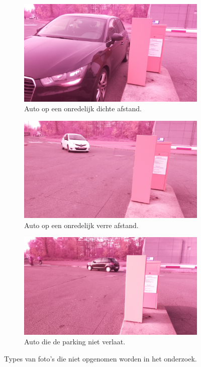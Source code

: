 \begin{figure}[h!]
	\centering
	\begin{subfigure}[b]{0.45\linewidth}
		\includegraphics[width=\linewidth]{img/slecht/close.jpg}
		\caption{Auto op een onredelijk dichte afstand.}
	\end{subfigure}
	\begin{subfigure}[b]{0.45\linewidth}
		\includegraphics[width=\linewidth]{img/slecht/far.jpg}
		\caption{Auto op een onredelijk verre afstand.}
	\end{subfigure}
	\begin{subfigure}[b]{0.45\linewidth}
	\includegraphics[width=\linewidth]{img/slecht/anderekant.jpg}
	\caption{Auto die de parking niet verlaat.}
	\end{subfigure}
	\caption{Types van foto's die niet opgenomen worden in het onderzoek.}
	\label{fig:badpics}
\end{figure}

